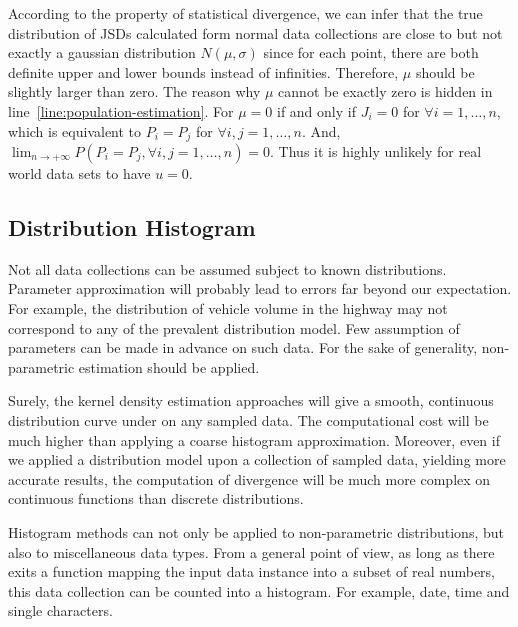 \documentclass[a4paper]{IEEEtran}
\begin{document}
			According to the property of statistical divergence, we can infer that the true distribution of JSDs calculated form normal data collections are close to but not exactly a gaussian distribution $N(\mu, \sigma)$ since for each point, there are both definite upper and lower bounds instead of infinities. Therefore, $\mu$ should be slightly larger than zero. The reason why $\mu$ cannot be exactly zero is hidden in line~\ref{line:population-estimation}.
			For $\mu = 0$ if and only if $J_i = 0$ for $\forall i = 1, \dots, n$, which is equivalent to $P_i = P_j$ for $\forall i, j = 1, \dots, n$. And, $\lim_{n\rightarrow+\infty}P(P_i = P_j,\forall i, j = 1, \dots, n)=0$. Thus it is highly unlikely for real world data sets to have $u=0$.
		
		\subsection{Distribution Histogram}\label{sec:alg-histogram}
			Not all data collections can be assumed subject to known distributions. Parameter approximation will probably lead to errors far beyond our expectation. For example, the distribution of vehicle volume in the highway may not correspond to any of the prevalent distribution model. Few assumption of parameters can be made in advance on such data. For the sake of generality, non-parametric estimation should be applied.
			
			Surely, the kernel density estimation approaches will give a smooth, continuous distribution curve under on any sampled data. The computational cost will be much higher than applying a coarse histogram approximation.
			Moreover, even if we applied a distribution model upon a collection of sampled data, yielding more accurate results, the computation of divergence will be much more complex on continuous functions than discrete distributions.
			
			Histogram methods can not only be applied to non-parametric distributions, but also to miscellaneous data types. From a general point of view, as long as there exits a function mapping the input data instance into a subset of real numbers, this data collection can be counted into a histogram. For example, date, time and single characters.
			
\end{document}
